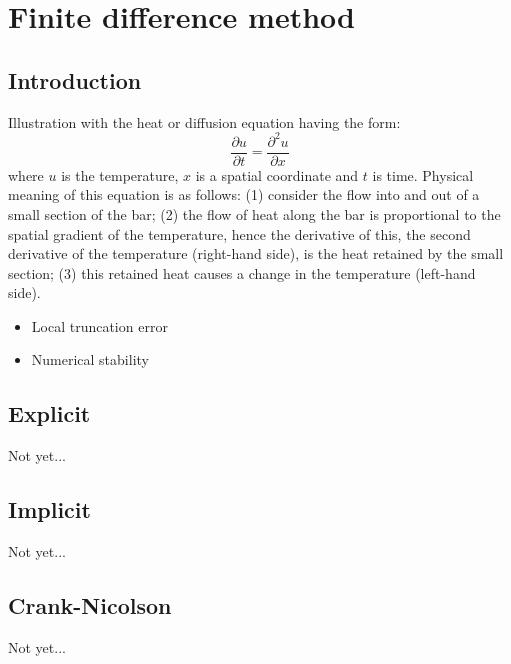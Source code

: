\section{Finite difference method}
\subsection{Introduction}
Illustration with the heat or diffusion equation having the form:
\begin{equation}
    \frac{\partial u}{\partial t} = \frac{\partial^2 u}{\partial x}
\end{equation}
where $u$ is the temperature, $x$ is a spatial coordinate and $t$ is time. Physical meaning of this equation is as follows: (1) consider the flow into and out of a small section of the bar; (2) the flow of heat along the bar is proportional to the spatial gradient of the temperature, hence the derivative of this, the second derivative of the temperature (right-hand side), is the heat retained by the small section; (3) this retained heat causes a change in the temperature (left-hand side).

\begin{itemize}
	\setlength\itemsep{0em}
    \item Local truncation error
    \item Numerical stability
\end{itemize}



\subsection{Explicit}
Not yet...



\subsection{Implicit}
Not yet...



\subsection{Crank-Nicolson}
Not yet...

